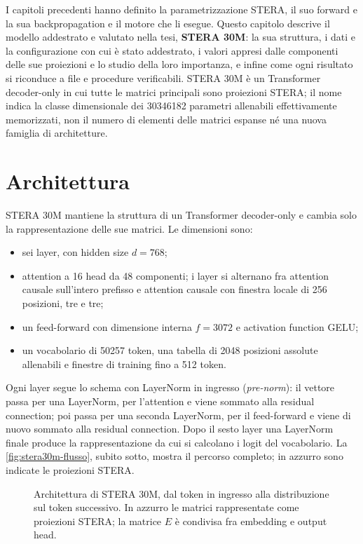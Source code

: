 I capitoli precedenti hanno definito la parametrizzazione STERA, il suo forward e la sua backpropagation e il motore che li esegue. Questo capitolo descrive il modello addestrato e valutato nella tesi, \textbf{STERA 30M}: la sua struttura, i dati e la configurazione con cui è stato addestrato, i valori appresi dalle componenti delle sue proiezioni e lo studio della loro importanza, e infine come ogni risultato si riconduce a file e procedure verificabili. STERA 30M è un Transformer decoder-only in cui tutte le matrici principali sono proiezioni STERA; il nome indica la classe dimensionale dei \num{30346182} parametri allenabili effettivamente memorizzati, non il numero di elementi delle matrici espanse né una nuova famiglia di architetture.

\section{Architettura}
\label{sec:architettura-stera30m}

STERA 30M mantiene la struttura di un Transformer decoder-only e cambia solo la rappresentazione delle sue matrici. Le dimensioni sono:
\begin{itemize}
\item sei layer, con hidden size $d=768$;
\item attention a 16 head da 48 componenti; i layer si alternano fra attention causale sull'intero prefisso e attention causale con finestra locale di 256 posizioni, tre e tre;
\item un feed-forward con dimensione interna $f=\num{3072}$ e activation function GELU;
\item un vocabolario di \num{50257} token, una tabella di \num{2048} posizioni assolute allenabili e finestre di training fino a 512 token.
\end{itemize}

Ogni layer segue lo schema con LayerNorm in ingresso (\emph{pre-norm}): il vettore passa per una LayerNorm, per l'attention e viene sommato alla residual connection; poi passa per una seconda LayerNorm, per il feed-forward e viene di nuovo sommato alla residual connection. Dopo il sesto layer una LayerNorm finale produce la rappresentazione da cui si calcolano i logit del vocabolario. La \autoref{fig:stera30m-flusso}, subito sotto, mostra il percorso completo; in azzurro sono indicate le proiezioni STERA.

\begin{figure}[H]
\centering
\resizebox{.92\linewidth}{!}{}
\caption{Architettura di STERA 30M, dal token in ingresso alla distribuzione sul token successivo. In azzurro le matrici rappresentate come proiezioni STERA; la matrice $E$ è condivisa fra embedding e output head.}
\label{fig:stera30m-flusso}
\end{figure}

